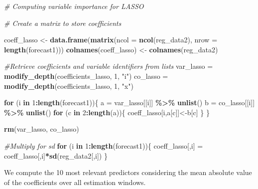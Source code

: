 \documentclass[
]{article}
\newenvironment{Shaded}{\begin{snugshade}}{\end{snugshade}}
\newcommand{\AttributeTok}[1]{\textcolor[rgb]{0.13,0.29,0.53}{#1}}
\newcommand{\CommentTok}[1]{\textcolor[rgb]{0.56,0.35,0.01}{\textit{#1}}}
\newcommand{\ControlFlowTok}[1]{\textcolor[rgb]{0.13,0.29,0.53}{\textbf{#1}}}
\newcommand{\DecValTok}[1]{\textcolor[rgb]{0.00,0.00,0.81}{#1}}
\newcommand{\FunctionTok}[1]{\textcolor[rgb]{0.13,0.29,0.53}{\textbf{#1}}}
\newcommand{\NormalTok}[1]{#1}
\newcommand{\OtherTok}[1]{\textcolor[rgb]{0.56,0.35,0.01}{#1}}
\newcommand{\SpecialCharTok}[1]{\textcolor[rgb]{0.81,0.36,0.00}{\textbf{#1}}}
\newcommand{\StringTok}[1]{\textcolor[rgb]{0.31,0.60,0.02}{#1}}
\begin{document}
\begin{Shaded}
\begin{Highlighting}[]
\CommentTok{\# Computing variable importance for LASSO}

\CommentTok{\# Create a matrix to store coefficients}

\NormalTok{coeff\_lasso }\OtherTok{\textless{}{-}} \FunctionTok{data.frame}\NormalTok{(}\FunctionTok{matrix}\NormalTok{(}\AttributeTok{ncol =} \FunctionTok{ncol}\NormalTok{(reg\_data2), }\AttributeTok{nrow =} \FunctionTok{length}\NormalTok{(forecast1)))}
\FunctionTok{colnames}\NormalTok{(coeff\_lasso) }\OtherTok{\textless{}{-}} \FunctionTok{colnames}\NormalTok{(reg\_data2)}

\CommentTok{\#Retrieve coefficients and variable identifiers from lists}
\NormalTok{var\_lasso }\OtherTok{=} \FunctionTok{modify\_depth}\NormalTok{(coefficients\_lasso, }\DecValTok{1}\NormalTok{, }\StringTok{"i"}\NormalTok{)}
\NormalTok{co\_lasso }\OtherTok{=} \FunctionTok{modify\_depth}\NormalTok{(coefficients\_lasso, }\DecValTok{1}\NormalTok{, }\StringTok{"x"}\NormalTok{)}

\ControlFlowTok{for}\NormalTok{ (i }\ControlFlowTok{in} \DecValTok{1}\SpecialCharTok{:}\FunctionTok{length}\NormalTok{(forecast1))\{}
\NormalTok{  a }\OtherTok{=}\NormalTok{ var\_lasso[[i]] }\SpecialCharTok{\%\textgreater{}\%} \FunctionTok{unlist}\NormalTok{()}
\NormalTok{  b }\OtherTok{=}\NormalTok{ co\_lasso[[i]] }\SpecialCharTok{\%\textgreater{}\%} \FunctionTok{unlist}\NormalTok{()}
    \ControlFlowTok{for}\NormalTok{ (c }\ControlFlowTok{in} \DecValTok{2}\SpecialCharTok{:}\FunctionTok{length}\NormalTok{(a))\{}
\NormalTok{      coeff\_lasso[i,a[c]]}\OtherTok{\textless{}{-}}\NormalTok{b[c]}
\NormalTok{    \}}
\NormalTok{\}}

\FunctionTok{rm}\NormalTok{(var\_lasso, co\_lasso)}

\CommentTok{\#Multiply for sd}
\ControlFlowTok{for}\NormalTok{ (i }\ControlFlowTok{in} \DecValTok{1}\SpecialCharTok{:}\FunctionTok{length}\NormalTok{(forecast1))\{}
\NormalTok{  coeff\_lasso[,i] }\OtherTok{=}\NormalTok{ coeff\_lasso[,i]}\SpecialCharTok{*}\FunctionTok{sd}\NormalTok{(reg\_data2[,i])}
\NormalTok{\}}
\end{Highlighting}
\end{Shaded}

We compute the 10 most relevant predictors considering the mean absolute
value of the coefficients over all estimation windows.
\end{document}
